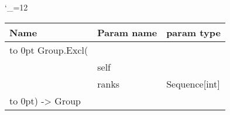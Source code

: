 \begingroup \catcode`\_=12 \tt
\begin{tabular}{lll}
\toprule
\textrm{Name}&\textrm{Param name}&\textrm{param type}\\
\midrule
\hbox to 0pt {Group.Excl(\hss}\\
& self\\
& ranks & Sequence[int]\\
\hbox to 0pt{) -> Group\hss}\\
\bottomrule
\end{tabular}
\endgroup
